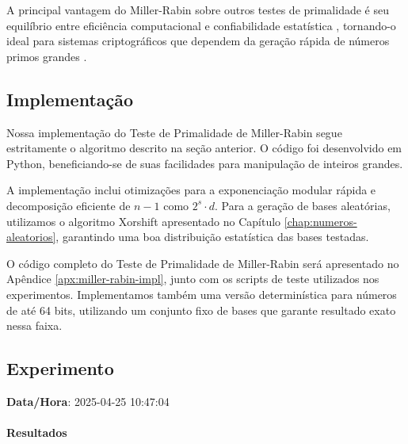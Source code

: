 A principal vantagem do Miller-Rabin sobre outros testes de primalidade é seu equilíbrio entre eficiência computacional e confiabilidade estatística \cite{shoup2009computational, yan2009primality}, tornando-o ideal para sistemas criptográficos que dependem da geração rápida de números primos grandes \cite{menezes1996handbook_miller}.

\subsection{Implementação}

Nossa implementação do Teste de Primalidade de Miller-Rabin segue estritamente o algoritmo descrito na seção anterior. O código foi desenvolvido em Python, beneficiando-se de suas facilidades para manipulação de inteiros grandes.

A implementação inclui otimizações para a exponenciação modular rápida e decomposição eficiente de $n-1$ como $2^s \cdot d$. Para a geração de bases aleatórias, utilizamos o algoritmo Xorshift apresentado no Capítulo \ref{chap:numeros-aleatorios}, garantindo uma boa distribuição estatística das bases testadas.

O código completo do Teste de Primalidade de Miller-Rabin será apresentado no Apêndice \ref{apx:miller-rabin-impl}, junto com os scripts de teste utilizados nos experimentos. Implementamos também uma versão determinística para números de até 64 bits, utilizando um conjunto fixo de bases que garante resultado exato nessa faixa.

\subsection{Experimento}

\textbf{Data/Hora}: 2025-04-25 10:47:04

\paragraph{Resultados}

